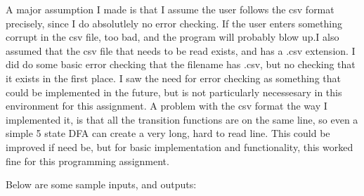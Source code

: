 \documentclass{article}
\begin{document}
A major assumption I made is that I assume the user follows the csv format precisely, since I do absolutlely no error checking. If the user enters something corrupt in the csv file, too bad, and the program will probably blow up.I also assumed that the csv file that needs to be read exists, and has a .csv extension. I did do some basic error checking that the filename has .csv, but no checking that it exists in the first place. I saw the need for error checking as something that could be implemented in the future, but is not particularly necessesary in this environment for this assignment. A problem with the csv format the way I implemented it, is that all the transition functions are on the same line, so even a simple 5 state DFA can create a very long, hard to read line. This could be improved if need be, but for basic implementation and functionality, this worked fine for this programming assignment.


Below are some sample inputs, and outputs:
\end{document}

